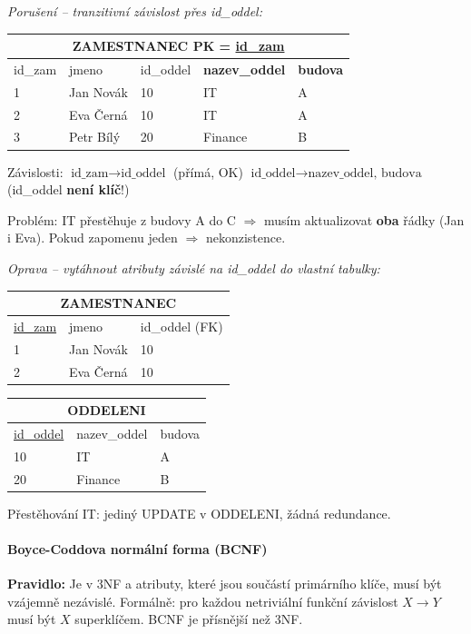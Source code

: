 \smallskip
\textit{Porušení -- tranzitivní závislost přes id\_oddel:}
\begin{center}\footnotesize
\begin{tabular}{lllll}
\toprule
\multicolumn{5}{c}{\textbf{ZAMESTNANEC} \quad PK = \underline{id\_zam}} \\
\midrule
id\_zam & jmeno & id\_oddel & \textbf{nazev\_oddel} & \textbf{budova} \\
\midrule
1 & Jan Novák & 10 & IT & A \\
2 & Eva Černá & 10 & IT & A \\
3 & Petr Bílý & 20 & Finance & B \\
\bottomrule
\end{tabular}
\end{center}

Závislosti: $\text{id\_zam} \to \text{id\_oddel}$ (přímá, OK) \quad
$\text{id\_oddel} \to \text{nazev\_oddel, budova}$ (id\_oddel \textbf{není klíč}!)

Problém: IT přestěhuje z budovy A do C $\Rightarrow$ musím aktualizovat \textbf{oba} řádky (Jan i Eva).
Pokud zapomenu jeden $\Rightarrow$ nekonzistence.

\textit{Oprava -- vytáhnout atributy závislé na id\_oddel do vlastní tabulky:}
\begin{center}\footnotesize
\begin{tabular}{lll}
\toprule
\multicolumn{3}{c}{\textbf{ZAMESTNANEC}} \\
\midrule
\underline{id\_zam} & jmeno & id\_oddel (FK) \\
1 & Jan Novák & 10 \\
2 & Eva Černá & 10 \\
\bottomrule
\end{tabular}
\quad
\begin{tabular}{lll}
\toprule
\multicolumn{3}{c}{\textbf{ODDELENI}} \\
\midrule
\underline{id\_oddel} & nazev\_oddel & budova \\
10 & IT & A \\
20 & Finance & B \\
\bottomrule
\end{tabular}
\end{center}
Přestěhování IT: jediný UPDATE v ODDELENI, žádná redundance.

\paragraph{Boyce-Coddova normální forma (BCNF)}
\textbf{Pravidlo:} Je v 3NF a atributy, které jsou součástí primárního klíče, musí být vzájemně nezávislé. Formálně: pro každou netriviální funkční závislost $X \to Y$ musí být $X$ superklíčem. BCNF je přísnější než 3NF.

